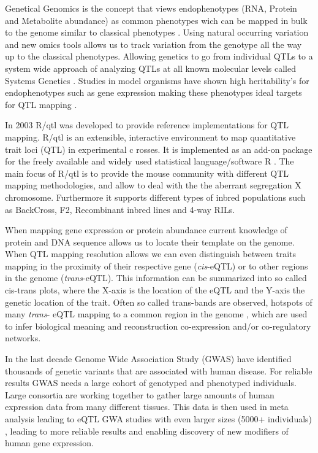 Genetical Genomics is the concept that views endophenotypes (RNA, Protein and Metabolite abundance) 
as common phenotypes wich can be mapped in bulk to the genome similar to classical 
phenotypes \cite{Jansen:2001a}. Using natural occurring variation and new omics tools allows us 
to track variation from the genotype all the way up to the classical phenotypes. Allowing 
genetics to go from individual QTLs to a system wide approach of analyzing QTLs at all known 
molecular levels called Systems Genetics \cite{Threadgill:2006}. Studies in model organisms 
have shown high heritability's for endophenotypes such as gene expression making these phenotypes 
ideal targets for QTL mapping \cite{Brem:2002}. 

In 2003 R/qtl was developed to provide reference implementations for QTL mapping. R/qtl is 
an extensible, interactive environment to map quantitative trait loci (QTL) in experimental c
rosses. It is implemented as an add-on package for the freely available and widely used 
statistical language/software R \cite{R:2009}. The main focus of R/qtl is to provide 
the mouse community with different QTL mapping methodologies, and allow to deal with the 
the aberrant segregation X chromosome. Furthermore it supports different types of inbred 
populations such as BackCross, F2, Recombinant inbred lines and 4-way RILs. \cite{Broman:2003}

When mapping gene expression or protein abundance current knowledge of protein and DNA sequence 
allows us to locate their template on the genome. When QTL mapping resolution allows we can even 
distinguish between traits mapping in the proximity of their respective gene (\emph{cis}-eQTL) 
or to other regions in the genome (\emph{trans}-eQTL). This information can be summarized into 
so called cis-trans plots, where the X-axis is the location of the eQTL and the Y-axis the genetic 
location of the trait. Often so called trans-bands are observed, hotspots of many \emph{trans}-
eQTL mapping to a common region in the genome \cite{Breitling:2008a}, which are used to infer 
biological meaning and reconstruction co-expression and/or co-regulatory networks.

In the last decade Genome Wide Association Study (GWAS) have identified thousands of genetic 
variants that are associated with human disease\cite{Hindorff:2009}. For reliable results GWAS 
needs a large cohort of genotyped and phenotyped individuals. Large consortia are working 
together to gather large amounts of human expression data from many different tissues. This 
data is then used in meta analysis leading to eQTL GWA studies with even larger sizes 
(5000+ individuals) \cite{Lude:2011}, leading to more reliable results and enabling discovery 
of new modifiers of human gene expression.

